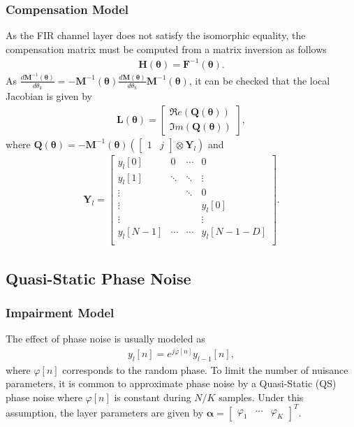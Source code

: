 \documentclass{article}
\begin{document}
\subsubsection{Compensation Model}
As the FIR channel layer does not satisfy the isomorphic equality, the compensation matrix must be computed from a matrix inversion as follows
\begin{align}
\mathbf{H}(\boldsymbol \theta)=\mathbf{F}^{-1}(\boldsymbol \theta).
\end{align}
As $\frac{d\mathbf{M}^{-1}(\boldsymbol  \theta)}{d\theta_k}=-\mathbf{M}^{-1}(\boldsymbol  \theta)\frac{d\mathbf{M}(\boldsymbol  \theta)}{d\theta_k}\mathbf{M}^{-1}(\boldsymbol  \theta)$, it can be checked that the local Jacobian is given by
\begin{align*}
\mathbf{L}(\boldsymbol \theta) = \begin{bmatrix}
\Re e(\mathbf{Q}(\boldsymbol \theta))\\
\Im m(\mathbf{Q}(\boldsymbol \theta))
\end{bmatrix},
\end{align*}
where $\mathbf{Q}(\boldsymbol \theta)=-\mathbf{M}^{-1}(\boldsymbol \theta)\left(\begin{bmatrix}
1&j \end{bmatrix}\otimes \mathbf{Y}_l\right)$ and
\begin{align}
\mathbf{Y}_l =\begin{bmatrix}
y_{l}[0] & 0 & \cdots &0 \\
y_{l}[1]&\ddots& \ddots&\vdots \\
\vdots && \ddots& 0\\
\vdots&  && y_{l}[0] \\
\vdots&  & & \vdots \\
y_{l}[N-1]&  \cdots& \cdots& y_{l}[N-1-D] \\
\end{bmatrix}.
\end{align}


\subsection{Quasi-Static Phase Noise}

\subsubsection{Impairment Model}
The effect of phase noise is usually modeled as \cite{KHA13,GHO17}
\begin{align}
y_{l}[n]=e^{j\varphi[n]}y_{l-1}[n],
\end{align}
where $\varphi[n]$ corresponds to the random phase. To limit the number of nuisance parameters, it is common to approximate phase noise by a Quasi-Static (QS) phase noise where $\varphi[n]$ is constant during $N/K$ samples. Under this assumption, the layer parameters are given by
$\boldsymbol \alpha = \begin{bmatrix}\varphi_1&\cdots&\varphi_{K}\end{bmatrix}^T$. 
\end{document}
